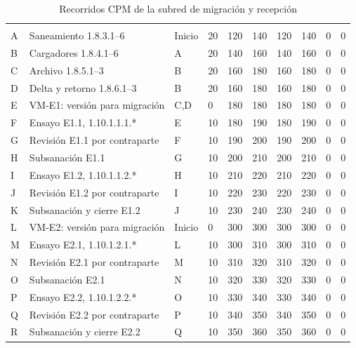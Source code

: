 \begingroup\small\setlength{\tabcolsep}{2pt}
\begin{longtable}{L{8mm}L{48mm}L{13mm}R{9mm}R{10mm}R{10mm}R{10mm}R{10mm}R{9mm}R{9mm}}
\caption{Recorridos CPM de la subred de migración y recepción}\label{tab:sd7-cpm}\\\hline
  &  &  &  &  &  &  &  &  & \\\hline
\endfirsthead
\hline {} &  &  &  &  &  &  &  &  & \\\hline\endhead
A & Saneamiento 1.8.3.1--6 & Inicio & 20 & 120 & 140 & 120 & 140 & 0 & 0 \\\hline
B & Cargadores 1.8.4.1--6 & A & 20 & 140 & 160 & 140 & 160 & 0 & 0\\\hline
C & Archivo 1.8.5.1--3 & B & 20 & 160 & 180 & 160 & 180 & 0 & 0 \\\hline
D & Delta y retorno 1.8.6.1--3 & B & 20 & 160 & 180 & 160 & 180 & 0 & 0\\\hline
E & VM-E1: versión para migración & C,D & 0 & 180 & 180 & 180 & 180 & 0 & 0 \\\hline
F & Ensayo E1.1, 1.10.1.1.1.* & E & 10 & 180 & 190 & 180 & 190 & 0 & 0\\\hline
G & Revisión E1.1 por contraparte & F & 10 & 190 & 200 & 190 & 200 & 0 & 0 \\\hline
H & Subsanación E1.1 & G & 10 & 200 & 210 & 200 & 210 & 0 & 0\\\hline
I & Ensayo E1.2, 1.10.1.1.2.* & H & 10 & 210 & 220 & 210 & 220 & 0 & 0 \\\hline
J & Revisión E1.2 por contraparte & I & 10 & 220 & 230 & 220 & 230 & 0 & 0\\\hline
K & Subsanación y cierre E1.2 & J & 10 & 230 & 240 & 230 & 240 & 0 & 0 \\\hline
L & VM-E2: versión para migración & Inicio & 0 & 300 & 300 & 300 & 300 & 0 & 0\\\hline
M & Ensayo E2.1, 1.10.1.2.1.* & L & 10 & 300 & 310 & 300 & 310 & 0 & 0 \\\hline
N & Revisión E2.1 por contraparte & M & 10 & 310 & 320 & 310 & 320 & 0 & 0\\\hline
O & Subsanación E2.1 & N & 10 & 320 & 330 & 320 & 330 & 0 & 0 \\\hline
P & Ensayo E2.2, 1.10.1.2.2.* & O & 10 & 330 & 340 & 330 & 340 & 0 & 0\\\hline
Q & Revisión E2.2 por contraparte & P & 10 & 340 & 350 & 340 & 350 & 0 & 0 \\\hline
R & Subsanación y cierre E2.2 & Q & 10 & 350 & 360 & 350 & 360 & 0 & 0\\\hline
\end{longtable}\endgroup
